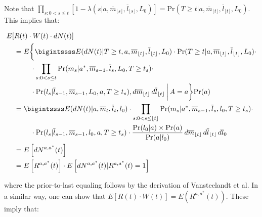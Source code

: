 \documentclass[AMA,STIX1COL]{WileyNJD-v2}
\newcommand{\pr}{\text{Pr}}
\begin{document}
Note that $ \bm \prod_{s: 0<s \le t} \left[ 1 - \lambda(s|a,\overline{m}_{\lfloor s \rfloor},\overline{l}_{\lfloor s \rfloor},L_0)\right] = \pr(T\ge t|a,\overline{m}_{\lfloor t \rfloor},\overline{l}_{\lfloor t \rfloor},L_0)$. This implies that:

\begingroup
\fontsize{10pt}{10pt}\selectfont
\begin{align*}
E[&R(t)\cdot W(t)\cdot dN(t)] \\
&=E\bigg\{\bigintssss  E (dN(t) | T\ge t, a,\overline{m}_{\lfloor t \rfloor}, \overline{l}_{\lfloor t \rfloor}, L_{0}) \cdot \pr(T\ge t|a,\overline{m}_{\lfloor t \rfloor},\overline{l}_{\lfloor t \rfloor},L_0)\cdot \\
&\,\,\,\,\,\,\,\,\,\,\,\,\,\, \cdot \prod_{s: 0<s\le t} \pr(m_{s}| a^*, \overline{m}_{s - 1}, \overline{l}_{s}, L_{0}, T\ge t_s) \cdot \\
&\,\,\,\,\,\,\,\,\,\,\,\,\,\, \cdot \pr(l_{s}|\overline{l}_{s-1}, \overline{m}_{s - 1}, L_0, a, T\ge t_s),d\overline{m}_{\lfloor t \rfloor}\,d\overline{l}_{\lfloor t \rfloor}\,\bigg\rvert\,A=a \bigg\}\pr(a)\\
&= \bigintssss  E( dN(t)|a, \overline{m}_{t}, \overline{l}_{t}, l_{0})\cdot \prod_{s:0<s\le\lfloor t \rfloor} \pr(m_{s}| a^*, \overline{m}_{s - 1}, \overline{l}_{s}, l_{0}, T\ge t_s)\cdot \\
&\,\,\,\,\,\,\,\,\,\,\,\,\,\,\cdot \pr(l_{s}|\overline{l}_{s-1}, \overline{m}_{s - 1}, l_{0}, a, T\ge t_s)\cdot \frac{\pr(l_{0}|a)\times \pr(a)}{\pr(a|l_0)}\,d\overline{m}_{\lfloor t \rfloor}\,d\overline{l}_{\lfloor t \rfloor}\,d l_0\\
&= E\left[dN^{a,a^*}(t)\right] \\
&=  E\left[R^{a,a^*}(t)\right]\cdot  E\left[dN^{a,a^*}(t)|R^{a,a^*}(t)=1\right]
\end{align*}
\endgroup

where the prior-to-last equaling follows by the derivation of Vansteelandt et al\citep{vansteelandt19}. In a similar way, one can show that $
E[R(t) \cdot W(t)]=  E \left(R^{a, a^*}(t)\right)$. These imply that:
\end{document}

